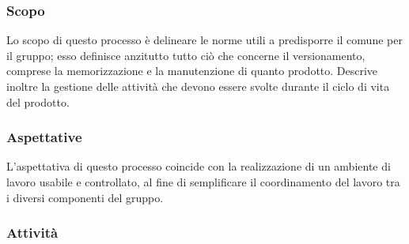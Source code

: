 \documentclass[../norme-di-progetto.tex]{subfiles}
\begin{document}
\subsubsection{Scopo}
Lo scopo di questo processo è delineare le norme utili a predisporre il  comune per il gruppo; esso definisce anzitutto tutto ciò che concerne il versionamento, comprese la memorizzazione e la manutenzione di quanto prodotto. Descrive inoltre la gestione delle attività che devono essere svolte durante il ciclo di vita del prodotto.

\subsubsection{Aspettative}
L'aspettativa di questo processo coincide con la realizzazione di un ambiente di lavoro usabile e controllato, al fine di semplificare il coordinamento del lavoro tra i diversi componenti del gruppo.

\subsubsection{Attività}
\end{document}
